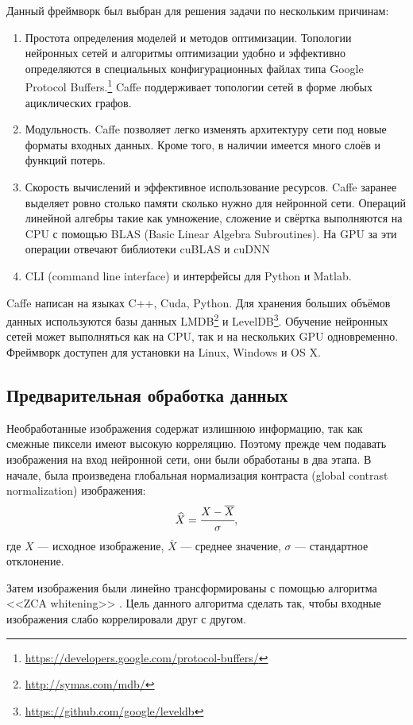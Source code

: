 Данный фреймворк был выбран для решения задачи по нескольким причинам:
\begin{enumerate}
    \item Простота определения моделей и методов оптимизации. Топологии нейронных сетей и алгоритмы оптимизации удобно и 
    эффективно определяются в специальных конфигурационных файлах типа Google Protocol 
    Buffers.\footnote{\url{https://developers.google.com/protocol-buffers/}} Caffe поддерживает топологии сетей в форме любых 
    ациклических графов.
    \item Модульность. Caffe позволяет легко изменять архитектуру сети под новые форматы входных данных. Кроме того, в наличии 
    имеется много слоёв и функций потерь.
    \item Скорость вычислений и эффективное использование ресурсов. Caffe заранее выделяет ровно столько памяти сколько нужно для 
    нейронной сети. Операций линейной алгебры такие как умножение, сложение и свёртка выполняются на CPU с помощью BLAS (Basic 
    Linear Algebra Subroutines). На GPU за эти операции отвечают библиотеки cuBLAS и cuDNN 
    \cite{DBLP:journals/corr/ChetlurWVCTCS14}
    \item CLI (command line interface) и интерфейсы для Python и Matlab.
\end{enumerate}

Caffe написан на языках C++, Cuda, Python. Для хранения больших объёмов данных используются базы данных 
LMDB\footnote{\url{http://symas.com/mdb/}} и LevelDB\footnote{\url{https://github.com/google/leveldb}}. Обучение нейронных сетей 
может выполняться как на CPU, так и на нескольких GPU одновременно. Фреймворк доступен для установки на Linux, Windows и OS X.

\subsection{Предварительная обработка данных}
Необработанные изображения содержат излишнюю информацию, так как смежные пиксели имеют высокую корреляцию. Поэтому прежде чем 
подавать изображения на вход нейронной сети, они были обработаны в два этапа. В начале, была произведена глобальная нормализация контраста
(global contrast normalization) изображения:
\[ \widehat{X} = \cfrac{X - \overline{X}}{\sigma},\]
где $X$ --- исходное изображение, $\overline{X}$ --- среднее значение, $\sigma$ --- стандартное отклонение.

Затем изображения были линейно трансформированы с помощью алгоритма <<ZCA whitening>> \cite{learningmultiple}.
Цель данного алгоритма сделать так, чтобы входные изображения слабо коррелировали друг с другом.

